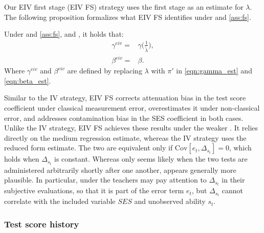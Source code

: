 Our EIV first stage (EIV FS) strategy uses the first stage as an estimate for $\lambda$. The following proposition formalizes what EIV FS identifies under  and \ref{ass:fs}.
\begin{proposition}\label{prop:fs}
Under  and \ref{ass:fs}, and , it holds that: 
    \begin{align}
        \gamma^{eiv}=&\gamma \Bigg(\frac{1}{\widetilde{\lambda}}\Bigg), \\ 
        \beta^{eiv}=&\beta.
    \end{align}
Where $\gamma^{eiv}$ and $\beta^{eiv}$ are defined by replacing $\lambda$ with $\pi'$ in \eqref{eqn:gamma_est} and \eqref{eqn:beta_est}.    
\end{proposition}

Similar to the IV strategy, EIV FS corrects attenuation bias in the test score coefficient under classical measurement error, overestimates it under non-classical error, and addresses contamination bias in the SES coefficient in both cases. Unlike the IV strategy, EIV FS achieves these results under the weaker . It relies directly on the medium regression estimate, whereas the IV strategy uses the reduced form estimate. The two are equivalent only if $\mathrm{Cov}[e_{t},\Delta_{s_t}]=0$, which 
holds when $\Delta_{s_t}$ is constant. Whereas  only seems likely when the two tests are administered arbitrarily shortly after one another,  appears generally more plausible. In particular, under  the teachers may pay attention to $\Delta_{s_t}$ in their subjective evaluations, so that it is part of the error term $e_{t}$, but $\Delta_{s_t}$ cannot correlate with the included variable $SES$ and unobserved ability $s_t$. %

\subsubsection{Test score history}


